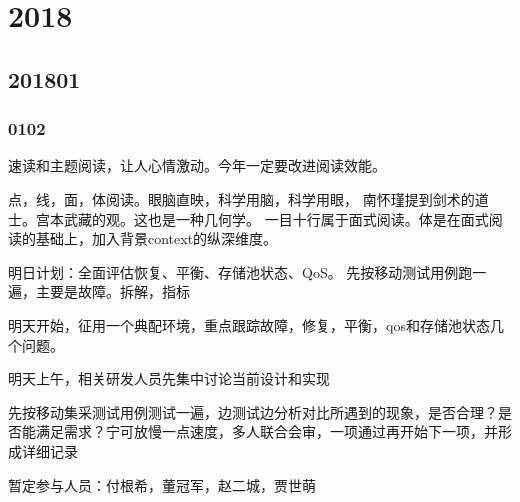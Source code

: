 \chapter{2018}

\section{201801}

\subsection{0102}

速读和主题阅读，让人心情激动。今年一定要改进阅读效能。

点，线，面，体阅读。眼脑直映，科学用脑，科学用眼，
南怀瑾提到剑术的道士。宫本武藏的观。这也是一种几何学。
一目十行属于面式阅读。体是在面式阅读的基础上，加入背景context的纵深维度。

明日计划：全面评估恢复、平衡、存储池状态、QoS。
先按移动测试用例跑一遍，主要是故障。拆解，指标

明天开始，征用一个典配环境，重点跟踪故障，修复，平衡，qos和存储池状态几个问题。

\begin{compactenum}
\item 明天上午，相关研发人员先集中讨论当前设计和实现
\item 先按移动集采测试用例测试一遍，边测试边分析对比所遇到的现象，是否合理？是否能满足需求？宁可放慢一点速度，多人联合会审，一项通过再开始下一项，并形成详细记录
\end{compactenum}

暂定参与人员：付根希，董冠军，赵二城，贾世萌
